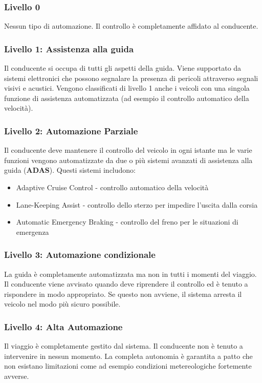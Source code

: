\subsubsection{Livello 0}
Nessun tipo di automazione. Il controllo è completamente affidato al conducente.
\subsubsection{Livello 1: Assistenza alla guida}
Il conducente si occupa di tutti gli aspetti della guida. Viene supportato da sistemi elettronici che possono  segnalare la presenza di pericoli attraverso segnali visivi e acustici.
Vengono classificati di livello 1 anche i veicoli con una singola funzione di assistenza automatizzata (ad esempio il controllo automatico della velocità).
\subsubsection{Livello 2: Automazione Parziale}
Il conducente deve mantenere il controllo del veicolo in ogni istante ma le  varie funzioni vengono automatizzate da 
due o più sistemi avanzati di assistenza alla guida (\textbf{ADAS}). Questi sistemi includono:
\begin{itemize}
    \item Adaptive Cruise Control - controllo automatico della velocità
    \item Lane-Keeping Assist - controllo dello sterzo per impedire l'uscita dalla corsia
    \item Automatic Emergency Braking -  controllo del freno per le situazioni di emergenza
\end{itemize}
\subsubsection{Livello 3: Automazione condizionale}
La guida è completamente automatizzata ma non in tutti i momenti del viaggio. Il conducente viene avvisato quando deve riprendere il controllo ed è tenuto a rispondere
in modo appropriato. Se questo non avviene, il sistema arresta il veicolo nel modo più sicuro possibile.
\subsubsection{Livello 4: Alta Automazione}
Il viaggio è completamente gestito dal sistema. Il conducente non è tenuto a intervenire in nessun momento. La completa autonomia è garantita a patto che non esistano limitazioni come ad esempio condizioni
metereologiche fortemente avverse.
